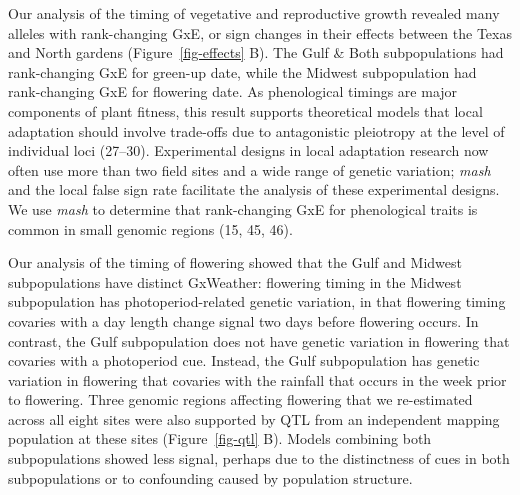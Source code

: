 \documentclass[
  9pt,
  twocolumn,
  twoside]{pnas-new}
\begin{document}
Our analysis of the timing of vegetative and reproductive growth
revealed many alleles with rank-changing GxE, or sign changes in their
effects between the Texas and North gardens (Figure~\ref{fig-effects}
B). The Gulf \& Both subpopulations had rank-changing GxE for green-up
date, while the Midwest subpopulation had rank-changing GxE for
flowering date. As phenological timings are major components of plant
fitness, this result supports theoretical models that local adaptation
should involve trade-offs due to antagonistic pleiotropy at the level of
individual loci (27--30). Experimental designs in local adaptation
research now often use more than two field sites and a wide range of
genetic variation; \emph{mash} and the local false sign rate facilitate
the analysis of these experimental designs. We use \emph{mash} to
determine that rank-changing GxE for phenological traits is common in
small genomic regions (15, 45, 46).

Our analysis of the timing of flowering showed that the Gulf and Midwest
subpopulations have distinct GxWeather: flowering timing in the Midwest
subpopulation has photoperiod-related genetic variation, in that
flowering timing covaries with a day length change signal two days
before flowering occurs. In contrast, the Gulf subpopulation does not
have genetic variation in flowering that covaries with a photoperiod
cue. Instead, the Gulf subpopulation has genetic variation in flowering
that covaries with the rainfall that occurs in the week prior to
flowering. Three genomic regions affecting flowering that we
re-estimated across all eight sites were also supported by QTL from an
independent mapping population at these sites (Figure~\ref{fig-qtl} B).
Models combining both subpopulations showed less signal, perhaps due to
the distinctness of cues in both subpopulations or to confounding caused
by population structure.
\end{document}
